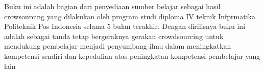 Buku ini adalah bagian dari penyediaan sumber belajar sebagai hasil crowsourcing yang dilakukan oleh program studi diploma IV teknik Infprmatika Politeknik Pos Indonesia selama 5 bulan terakhir. Dengan dirilisnya buku ini adalah sebagai tanda tetap bergeraknya gerakan crowdsourcing untuk mendukung pembelajar menjadi penyumbang ilmu dalam meningkatkan kompetensi sendiri dan kepedulian atas peningkatan kompetensi pembelajar yang lain